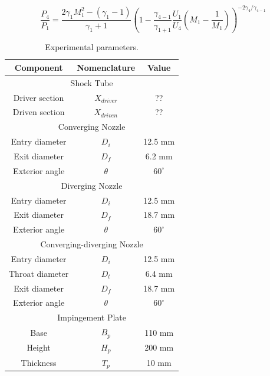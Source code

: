 \begin{equation} \label{shock}
\frac{P_4}{P_1} = \frac{2\gamma_1M_1^2 - (\gamma_1 - 1)}{\gamma_1 + 1}\left(1 - \frac{\gamma_{4-1}}{\gamma_{1+1}}\frac{U_1}{U_4}\left(M_1 - \frac{1}{M_1}\right)\right)^{-2\gamma_4/\gamma_{4-1}}
\end{equation}
\smallskip
\begin{table}[H]
\centering
\caption{Experimental parameters.}
\label{tab:experiment}
\begin{tabular}{@{}ccc@{}}
\toprule
\toprule
\textbf{Component} & \textbf{Nomenclature} & \textbf{Value} \\ \midrule
\multicolumn{3}{c}{Shock Tube}                                  \\ \midrule
Driver section     & $X_{driver}$          & ??                 \\
Driven section     & $X_{driven}$          & ??                 \\ \midrule
\multicolumn{3}{c}{Converging Nozzle}                           \\ \midrule
Entry diameter     & $D_i$                 & 12.5 mm            \\
Exit diameter      & $D_f$                 & 6.2 mm             \\
Exterior angle     & $\theta$              & $60^\circ$         \\ \midrule
\multicolumn{3}{c}{Diverging Nozzle}                            \\ \midrule
Entry diameter     & $D_i$                 & 12.5 mm            \\
Exit diameter      & $D_f$                 & 18.7 mm            \\
Exterior angle     & $\theta$              & $60^\circ$         \\ \midrule
\multicolumn{3}{c}{Converging-diverging Nozzle}                 \\ \midrule
Entry diameter     & $D_i$                 & 12.5 mm            \\
Throat diameter    & $D_t$                 & 6.4 mm             \\
Exit diameter      & $D_f$                 & 18.7 mm            \\
Exterior angle     & $\theta$              & $60^\circ$         \\ \midrule
\multicolumn{3}{c}{Impingement Plate}                           \\ \midrule
Base               & $B_p$                 & 110 mm             \\
Height             & $H_p$                 & 200 mm             \\
Thickness          & $T_p$                 & 10 mm              \\ \bottomrule
\bottomrule
\end{tabular}
\end{table}

